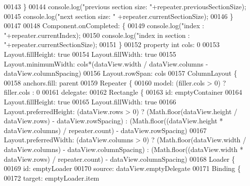\begin{DoxyCode}
{00143 \textcolor{comment}{                    \}}
00144 \textcolor{comment}{                    console.log("previous section size: "+repeater.previousSectionSize);}
00145 \textcolor{comment}{                    console.log("next section size: " +repeater.currentSectionSize);}
00146 \textcolor{comment}{                \}}
00147 \textcolor{comment}{}
00148 \textcolor{comment}{                Component.onCompleted: \{}
00149 \textcolor{comment}{                    console.log("index : "+repeater.currentIndex);}
00150 \textcolor{comment}{                    console.log("index in section : "+repeater.currentSectionSize);}
00151 \textcolor{comment}{                \}}
00152 \textcolor{comment}{                property int cols: 0}
00153 \textcolor{comment}{                Layout.fillHeight: true}
00154 \textcolor{comment}{                Layout.fillWidth: true}
00155 \textcolor{comment}{                Layout.minimumWidth: cols*(dataView.width / dataView.columns  - dataView.columnSpacing)}
00156 \textcolor{comment}{                Layout.rowSpan: cols}
00157 \textcolor{comment}{                ColumnLayout \{}
00158 \textcolor{comment}{                    anchors.fill: parent}
00159 \textcolor{comment}{                    Repeater \{}
00160 \textcolor{comment}{                        model: (filler.cols > 0) ? filler.cols : 0}
00161 \textcolor{comment}{                        delegate:}
00162 \textcolor{comment}{                            Rectangle \{}
00163 \textcolor{comment}{                            id: emptyContainer}
00164 \textcolor{comment}{                            Layout.fillHeight: true}
00165 \textcolor{comment}{                            Layout.fillWidth: true}
00166 \textcolor{comment}{                            Layout.preferredHeight: (dataView.rows > 0) ? (Math.floor(dataView.height /
       dataView.rows) - dataView.rowSpacing) : (Math.floor((dataView.height * dataView.columns) / repeater.count) -
       dataView.rowSpacing)}
00167 \textcolor{comment}{                            Layout.preferredWidth: (dataView.columns > 0) ? (Math.floor(dataView.width /
       dataView.columns) - dataView.columnSpacing) : (Math.floor((dataView.width * dataView.rows) / repeater.count) -
       dataView.columnSpacing)}
00168 \textcolor{comment}{                            Loader \{}
00169 \textcolor{comment}{                                id: emptyLoader}
00170 \textcolor{comment}{                                source: dataView.emptyDelegate}
00171 \textcolor{comment}{                                Binding \{}
00172 \textcolor{comment}{                                    target: emptyLoader.item}
}
\end{DoxyCode}
